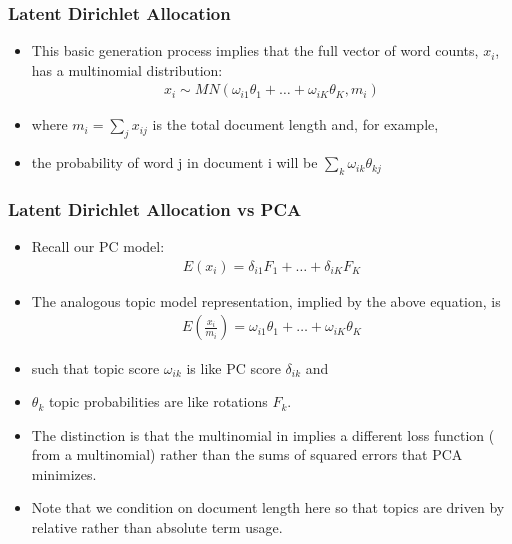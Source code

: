 \documentclass[
  shownotes,
  xcolor={svgnames},
  hyperref={colorlinks,citecolor=DarkBlue,linkcolor=DarkRed,urlcolor=DarkBlue}
  , aspectratio=169]{beamer}
\begin{document}
\begin{frame}
\frametitle{Latent Dirichlet Allocation}

\begin{itemize}


\item This basic generation process implies that the full vector of word counts, $x_i$, has a multinomial  distribution: 
\medskip
\begin{align}
x_i \sim MN(\omega_{i1}\theta_1+\dots+\omega_{iK}\theta_K,m_i)
\end{align}
\medskip
\item where $m_i=\sum_j x_{ij}$ is the total document length and, for example, 
\medskip
\item the probability of word j in document i will be $\sum_k \omega_{ik}\theta_{kj}$

\end{itemize}


\end{frame}
\begin{frame}
\frametitle{Latent Dirichlet Allocation vs PCA}

\begin{itemize}
\item Recall our PC model:
\medskip
\begin{align}
E(x_i) = \delta_{i1} F_1 + \dots + \delta_{iK} F_K
\end{align}

\medskip
\item The analogous topic model representation, implied by the above equation, is
\medskip
\begin{align}
E(\frac{x_i}{m_i}) = \omega_{i1} \theta_1 + \dots + \omega_{iK} \theta_K
\end{align}

 

\item such that topic score $\omega_{ik}$ is like PC score $\delta_{ik}$ and 
\item $\theta_k$ topic probabilities are like rotations $F_k$. 
\item The distinction is that the multinomial in implies a different loss function ( from a multinomial) rather than the sums of squared errors that PCA minimizes. 
\item Note that we condition on document length here so that topics are driven by relative rather than absolute term usage. 
\end{itemize}

\end{frame}
\end{document}
